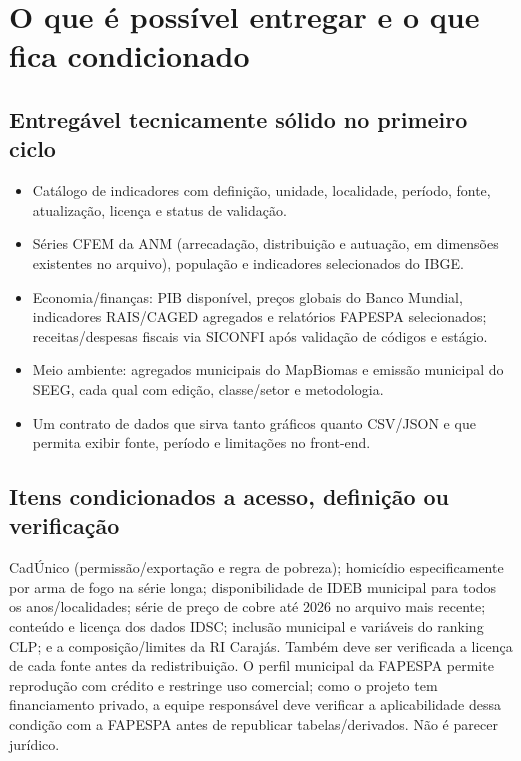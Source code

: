 \documentclass[12pt]{article}
\begin{document}
\section{O que é possível entregar e o que fica condicionado}
\subsection{Entregável tecnicamente sólido no primeiro ciclo}
\begin{itemize}
  \item Catálogo de indicadores com definição, unidade, localidade, período, fonte, atualização, licença e status de validação.
  \item Séries CFEM da ANM (arrecadação, distribuição e autuação, em dimensões existentes no arquivo), população e indicadores selecionados do IBGE.
  \item Economia/finanças: PIB disponível, preços globais do Banco Mundial, indicadores RAIS/CAGED agregados e relatórios FAPESPA selecionados; receitas/despesas fiscais via SICONFI após validação de códigos e estágio.
  \item Meio ambiente: agregados municipais do MapBiomas e emissão municipal do SEEG, cada qual com edição, classe/setor e metodologia.
  \item Um contrato de dados que sirva tanto gráficos quanto CSV/JSON e que permita exibir fonte, período e limitações no front-end.
\end{itemize}

\subsection{Itens condicionados a acesso, definição ou verificação}
CadÚnico (permissão/exportação e regra de pobreza); homicídio especificamente por arma de fogo na série longa; disponibilidade de IDEB municipal para todos os anos/localidades; série de preço de cobre até 2026 no arquivo mais recente; conteúdo e licença dos dados IDSC; inclusão municipal e variáveis do ranking CLP; e a composição/limites da RI Carajás. Também deve ser verificada a licença de cada fonte antes da redistribuição. O perfil municipal da FAPESPA permite reprodução com crédito e restringe uso comercial; como o projeto tem financiamento privado, a equipe responsável deve verificar a aplicabilidade dessa condição com a FAPESPA antes de republicar tabelas/derivados. Não é parecer jurídico.
\end{document}
